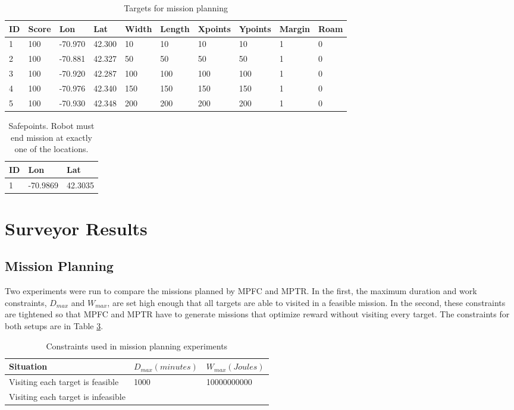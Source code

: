 \documentclass{tamuccthesis}
\begin{document}
\begin{table}[H]\small
    \begin{tabular}{|l|l|l|l|l|l|l|l|l|l|}
\hline
ID & Score & Lon & Lat & Width & Length & Xpoints & Ypoints & Margin & Roam \\
\hline
1 & 100 & -70.970 & 42.300 & 10 & 10 & 10 & 10 & 1 & 0 \\
\hline
2 & 100 & -70.881 & 42.327 & 50 & 50 & 50 & 50 & 1 & 0 \\
\hline
3 & 100 & -70.920 & 42.287 & 100 & 100 & 100 & 100 & 1 & 0 \\
\hline
4 & 100 & -70.976 & 42.340 & 150 & 150 & 150 & 150 & 1 & 0 \\
\hline
5 & 100 & -70.930 & 42.348 & 200 & 200 & 200 & 200 & 1 & 0 \\
\hline  
        
    \end{tabular}
    \caption{Targets for mission planning}
    \label{tbl:targets}
\end{table}

\begin{table}[H]\small
    \begin{tabular}{|l|l|l|}
\hline
ID & Lon & Lat\\
\hline
1 & -70.9869 & 42.3035 \\
\hline  
    \end{tabular}
    \caption{Safepoints. Robot must end mission at exactly one of the locations.}
    \label{tbl:safepoints}
\end{table}

\section{Surveyor Results}

\subsection{Mission Planning}

Two experiments were run to compare the missions planned by MPFC and MPTR. In the first, the maximum duration and work constraints, $D_{max}$ and $W_{max}$, are set high enough that all targets are able to visited in a feasible mission. In the second, these constraints are tightened so that MPFC and MPTR have to generate missions that optimize reward without visiting every target. The constraints for both setups are in Table \ref{tbl:constraints}.

\begin{table}[H]\small
    \begin{tabular}{|l|l|l|}
\hline
Situation & $D_{max} (minutes)$ & $W_{max} (Joules)$ \\
\hline
Visiting each target is feasible & 1000 & 10000000000 \\
\hline  
Visiting each target is infeasible &    & \\
\hline
    \end{tabular}
    \caption{Constraints used in mission planning experiments}
    \label{tbl:constraints}
\end{table}
\end{document}
